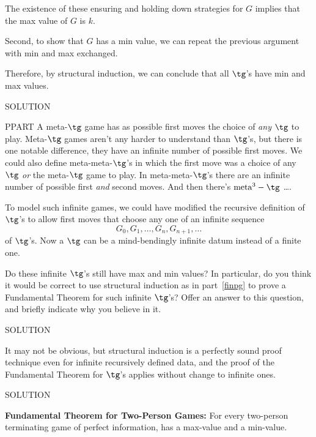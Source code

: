 \begin{definition}
The existence of these ensuring and holding down strategies for $G$
implies that the max value of $G$ is $k$.

Second, to show that $G$ has a min value, we can repeat the previous
argument with min and max exchanged.

Therefore, by structural induction, we can conclude that all $\tg$'s have
min and max values.

SOLUTION

PPART A meta-$\tg$ game has as possible first moves the choice of
\emph{any} $\tg$ to play.  Meta-$\tg$ games aren't any harder to
understand than $\tg$'s, but there is one notable difference, they
have an infinite number of possible first moves.  We could also define
meta-meta-$\tg$'s in which the first move was a choice of any
$\tg$ \emph{or} the meta-$\tg$ game to play.  In
meta-meta-$\tg$'s there are an infinite number of possible first
\emph{and} second moves.  And then there's $\text{meta}^3-\tg$ \dots.

\iffalse
The 2D-origin game in a Week 4 class problem is a game in which there are
an infinite number of possible first moves, an infinite number of possible
second moves, \dots.  \iffalse (with two values, ``win'' or ``lose''
instead of values from -50 to 50)\fi
\fi

To model such infinite games, we could have modified the recursive
definition of $\tg$'s to allow first moves that choose any one of an
infinite sequence
\[
G_0,G_1,\dots,G_n,G_{n+1}, \dots
\]
of $\tg$'s.  Now a $\tg$ can be a mind-bendingly infinite datum
instead of a finite one.

Do these infinite $\tg$'s still have max and min values?  In
particular, do you think it would be correct to use structural induction
as in part~\eqref{finpg} to prove a Fundamental Theorem for such infinite
$\tg$'s?  Offer an answer to this question, and briefly indicate why
you believe in it.

SOLUTION

It may not be obvious, but structural induction is a perfectly sound proof
technique even for infinite recursively defined data, and the proof of the
Fundamental Theorem for $\tg$'s applies without change to infinite ones.

SOLUTION

\begin{theorem}\label{fund}
  \textbf{Fundamental Theorem for Two-Person Games:} For every two-person
  terminating game of perfect information, has a max-value and a
  min-value.
\end{theorem}


\end{definition}
